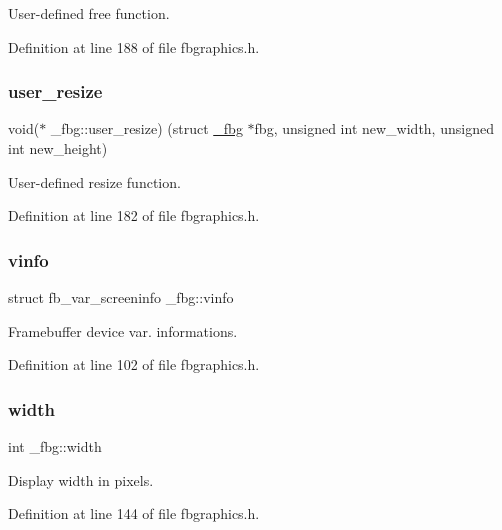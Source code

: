 User-\/defined free function. 



Definition at line 188 of file fbgraphics.\+h.

\mbox{\label{struct__fbg_a68add70dac4b055809c1bcab1e65b18d}} 
\subsubsection{\texorpdfstring{user\+\_\+resize}{user\_resize}}
{\footnotesize\ttfamily void($\ast$ \+\_\+fbg\+::user\+\_\+resize) (struct \mbox{\hyperlink{struct__fbg}{\+\_\+fbg}} $\ast$fbg, unsigned int new\+\_\+width, unsigned int new\+\_\+height)}



User-\/defined resize function. 



Definition at line 182 of file fbgraphics.\+h.

\mbox{\label{struct__fbg_a22447f0d56680de6ff37587b44f7cf4b}} 
\subsubsection{\texorpdfstring{vinfo}{vinfo}}
{\footnotesize\ttfamily struct fb\+\_\+var\+\_\+screeninfo \+\_\+fbg\+::vinfo}



Framebuffer device var. informations. 



Definition at line 102 of file fbgraphics.\+h.

\mbox{\label{struct__fbg_a1d3c76643e4ee424f4d17e27991d5e2e}} 
\subsubsection{\texorpdfstring{width}{width}}
{\footnotesize\ttfamily int \+\_\+fbg\+::width}



Display width in pixels. 



Definition at line 144 of file fbgraphics.\+h.

